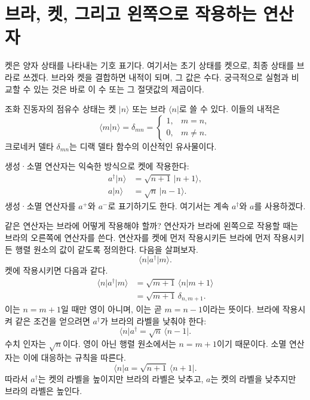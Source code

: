 \section{브라, 켓, 그리고 왼쪽으로 작용하는 연산자}

켓은 양자 상태를 나타내는 기호 표기다. 여기서는 초기 상태를 켓으로, 최종 상태를 브라로 쓰겠다. 브라와 켓을 결합하면 내적이 되며, 그 값은 수다. 궁극적으로 실험과 비교할 수 있는 것은 바로 이 수 또는 그 절댓값의 제곱이다.

\begin{classroomqa}
\end{classroomqa}

조화 진동자의 점유수 상태는 켓 \(\lvert n\rangle\) 또는 브라 \(\langle n\rvert\)로 쓸 수 있다. 이들의 내적은
\begin{equation}
\langle m\vert n\rangle=\delta_{mn}
=\begin{cases}
1,&m=n,\\
0,&m\neq n.
\end{cases}
\end{equation}
크로네커 델타 \(\delta_{mn}\)는 디랙 델타 함수의 이산적인 유사물이다.

생성·소멸 연산자는 익숙한 방식으로 켓에 작용한다:
\begin{align}
a^\dagger\lvert n\rangle&=\sqrt{n+1}\,\lvert n+1\rangle,\\
a\lvert n\rangle&=\sqrt n\,\lvert n-1\rangle.
\end{align}
생성·소멸 연산자를 \(a^+\)와 \(a^-\)로 표기하기도 한다. 여기서는 계속 \(a^\dagger\)와 \(a\)를 사용하겠다.

같은 연산자는 브라에 어떻게 작용해야 할까? 연산자가 브라에 왼쪽으로 작용할 때는 브라의 오른쪽에 연산자를 쓴다. 연산자를 켓에 먼저 작용시키든 브라에 먼저 작용시키든 행렬 원소의 값이 같도록 정의한다. 다음을 살펴보자.
\begin{equation}
\langle n\rvert a^\dagger\lvert m\rangle.
\end{equation}
켓에 작용시키면 다음과 같다.
\begin{align}
\langle n\rvert a^\dagger\lvert m\rangle
&=\sqrt{m+1}\,\langle n\vert m+1\rangle\\
&=\sqrt{m+1}\,\delta_{n,m+1}.
\end{align}
이는 \(n=m+1\)일 때만 영이 아니며, 이는 곧 \(m=n-1\)이라는 뜻이다. 브라에 작용시켜 같은 조건을 얻으려면 \(a^\dagger\)가 브라의 라벨을 낮춰야 한다:
\begin{equation}
\langle n\rvert a^\dagger
=\sqrt n\,\langle n-1\rvert.
\end{equation}
수치 인자는 \(\sqrt n\)이다. 영이 아닌 행렬 원소에서는 \(n=m+1\)이기 때문이다. 소멸 연산자는 이에 대응하는 규칙을 따른다.
\begin{equation}
\langle n\rvert a
=\sqrt{n+1}\,\langle n+1\rvert.
\end{equation}
따라서 \(a^\dagger\)는 켓의 라벨을 높이지만 브라의 라벨은 낮추고, \(a\)는 켓의 라벨을 낮추지만 브라의 라벨은 높인다.

